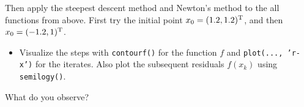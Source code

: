Then apply the steepest descent method and Newton's method to the all
functions from above.  First try the initial point $x_0=(1.2, 1.2)^{\text{\upshape T}}$, and
then $x_0=(-1.2, 1)^{\text{\upshape T}}$.
\begin{itemize}
  \item Visualize the steps with \texttt{contourf()} for the function $f$ and
    \texttt{plot(..., 'r-x')} for the iterates. Also plot the subsequent
    residuals $f(x_k)$ using \texttt{semilogy()}.
\end{itemize}
What do you observe?


